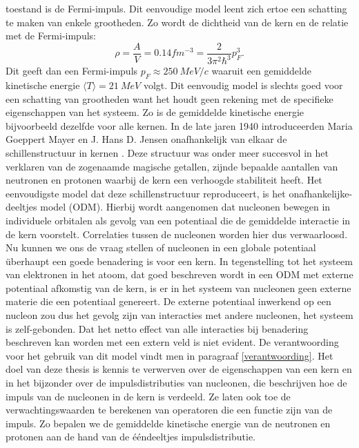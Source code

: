 \documentclass[11pt,twoside]{book}
\begin{document}
toestand is de Fermi-impuls. Dit eenvoudige model leent zich ertoe een schatting te maken van enkele grootheden. Zo wordt de dichtheid van de kern en de relatie met de Fermi-impuls:
\begin{equation}
\rho = \frac{A}{V} = 0.14 fm^{-3} =  \frac{2}{3\pi^2 \hbar^3} p^3_F.
\end{equation}
Dit geeft dan een Fermi-impuls $p_F \approx 250\ MeV/c$ waaruit een gemiddelde kinetische energie $\langle T \rangle = 21\ MeV$ volgt. Dit eenvoudig model is slechts goed voor een schatting van grootheden want het houdt geen rekening met de specifieke eigenschappen van het systeem. Zo is de gemiddelde kinetische energie bijvoorbeeld dezelfde voor alle kernen.
In de late jaren 1940 introduceerden Maria Goeppert Mayer en J. Hans D. Jensen onafhankelijk van elkaar de schillenstructuur in kernen \cite{mayer,jensen}. Deze structuur was onder meer succesvol in het verklaren van de zogenaamde magische getallen, zijnde bepaalde aantallen van neutronen en protonen waarbij de kern een verhoogde stabiliteit heeft. 
Het eenvoudigste model dat deze schillenstructuur reproduceert, is het onafhankelijke-deeltjes model (ODM). Hierbij wordt aangenomen dat nucleonen bewegen in individuele orbitalen als gevolg van een potentiaal die de gemiddelde interactie in de kern voorstelt. Correlaties tussen de nucleonen worden hier dus verwaarloosd. Nu kunnen we ons de vraag stellen of nucleonen in een globale potentiaal \"{u}berhaupt een goede benadering is voor een kern. 
In tegenstelling tot het systeem van elektronen in het atoom, dat goed beschreven wordt in een ODM met externe potentiaal afkomstig van de kern, is er in het systeem van nucleonen geen externe materie die een potentiaal genereert. De externe potentiaal inwerkend op een nucleon zou dus het gevolg zijn van interacties met andere nucleonen, het systeem is zelf-gebonden. Dat het netto effect van alle interacties bij benadering beschreven kan worden met een extern veld is niet evident. De verantwoording voor het gebruik van dit model vindt men in paragraaf \ref{verantwoording}. 
Het doel van deze thesis is kennis te verwerven over de eigenschappen van een kern en in het bijzonder over de impulsdistributies van nucleonen, die beschrijven hoe de impuls van de nucleonen in de kern is verdeeld. Ze laten ook toe de verwachtingswaarden te berekenen van operatoren die een functie zijn van de impuls. Zo bepalen we de gemiddelde kinetische energie van de neutronen en protonen aan de hand van de \'{e}\'{e}ndeeltjes impulsdistributie.
\end{document}
